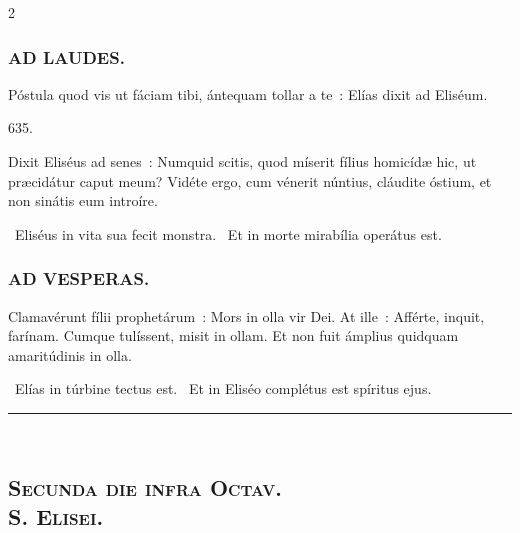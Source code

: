 \documentclass[9pt,twoside]{extarticle}
\begin{document}
\begin{multicols}{2}
\subsubsection*{\center \textsc{AD LAUDES.}}
\begin{tightlist}{}
\item {} Póstula quod vis ut fáciam tibi, ántequam tollar a te~: Elías dixit ad Eliséum.
\item {} 635.
\item {} Dixit Eliséus ad senes~: Numquid scitis, quod míserit fílius homicídæ hic, ut præcidátur caput meum? Vidéte ergo, cum vénerit núntius, cláudite óstium, et non sinátis eum introíre.
\item {}
\item {}~Eliséus in vita sua fecit monstra. ~Et in morte mirabília operátus est.
\item {}
\end{tightlist}

\subsubsection*{\center \textsc{AD VESPERAS.}}
\begin{tightlist}{}
\item {}
\item {} Clamavérunt fílii prophetárum~: Mors in olla vir Dei. At ille~: Afférte, inquit, farínam. Cumque tulíssent, misit in ollam. Et non fuit ámplius quidquam amaritúdinis in olla.
\item {}
\item {}~Elías in túrbine tectus est. ~Et in Eliséo complétus est spíritus ejus.
\end{tightlist}

\begin{center}\textcolor{red}{\rule{\linewidth}{0.5pt}} \end{center}

\subsection*{\center \textsc{\\ Secunda die infra Octav.\\
S. Elisei.}}

\end{multicols}
\end{document}
